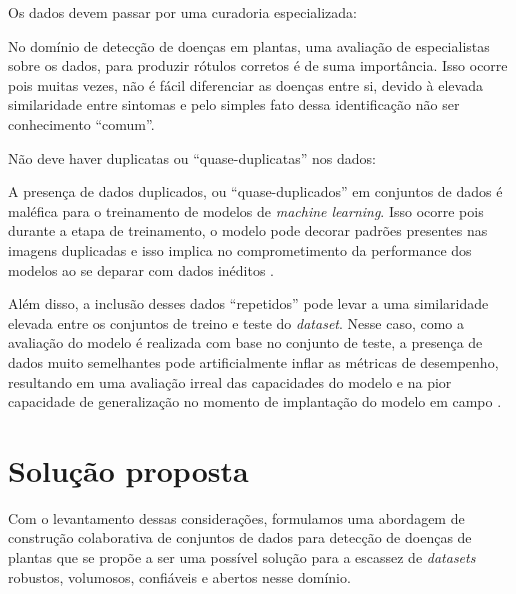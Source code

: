 \begin{enumerate}
{\bf \item Os dados devem passar por uma curadoria especializada:}

No domínio de detecção de doenças em plantas, uma avaliação de especialistas sobre os dados, para produzir rótulos corretos é de suma importância. Isso ocorre pois muitas vezes, não é fácil diferenciar as doenças entre si, devido à elevada similaridade entre sintomas e pelo simples fato dessa identificação não ser conhecimento ``comum''.

{\bf \item Não deve haver duplicatas ou ``quase-duplicatas'' nos dados:}

A presença de dados duplicados, ou ``quase-duplicados'' em conjuntos de dados é maléfica para o treinamento de modelos de \emph{machine learning}. Isso ocorre pois durante a etapa de treinamento, o modelo pode decorar padrões presentes nas imagens duplicadas e isso implica no comprometimento da performance dos modelos ao se deparar com dados inéditos \citep{Barz2019Do}. 

Além disso, a inclusão desses dados ``repetidos'' pode levar a uma similaridade elevada entre os conjuntos de treino e teste do \emph{dataset}. Nesse caso, como a avaliação do modelo é realizada com base no conjunto de teste, a presença de dados muito semelhantes pode artificialmente inflar as métricas de desempenho, resultando em uma avaliação irreal das capacidades do modelo e na pior capacidade de generalização no momento de implantação do modelo em campo \citep{Barz2019Do}.

\end{enumerate}


\section{Solução proposta}
Com o levantamento dessas considerações, formulamos uma abordagem de construção colaborativa de conjuntos de dados para detecção de doenças de plantas que se propõe a ser uma possível solução para a escassez de \emph{datasets} robustos, volumosos, confiáveis e abertos nesse domínio.

